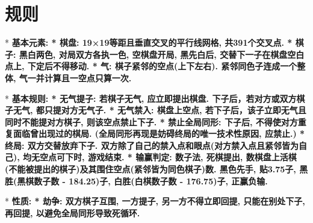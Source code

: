         \section{规则}
            *  \bf{基本元素}:
                * \bf{棋盘}: 19×19等距且垂直交叉的平行线网格, 共391个交叉点.
                * \bf{棋子}: 黑白两色, 对局双方各执一色, 空棋盘开局, 黑先白后, 交替下一子在棋盘空白点上, 下定后不得移动.
                * \bf{气}: 棋子紧邻的空点(上下左右). 紧邻同色子连成一个整体, 气一并计算且一空点只算一次.
            
            *  \bf{基本规则}:
                * \bf{无气提子}: 若棋子无气, 应立即提出棋盘. 下子后，若对方或双方棋子无气, 都只提对方无气子.
                * \bf{无气禁入}: 棋盘上空点, 若下子后，该子立即无气且同时不能提对方棋子, 则该空点禁止下子.
                * \bf{禁止全局同形}: 下子后, 不得使对方重复面临曾出现过的棋局. (全局同形再现是妨碍终局的唯一技术性原因, 应禁止.)
                * \bf{终局}: 双方交替放弃下子. 双方除了自己的禁入点和眼点(对方禁入点且紧邻皆为自己), 均无空点可下时, 游戏结束.
                * \bf{输赢判定}: 数子法, 死棋提出, 数棋盘上活棋(不能被提出的棋子)及其围住空点(紧邻皆为同色棋子)数. 黑色先手, 贴3.75子, 黑胜(黑棋数子数 - 184.25)子, 白胜(白棋数子数 - 176.75)子, 正赢负输.
                
            * \bf{性质}:
                * \bf{劫争}: 双方棋子互围, 一方提子, 另一方不得立即回提, 只能在别处下子, 再回提, 以避免全局同形导致死循环.
